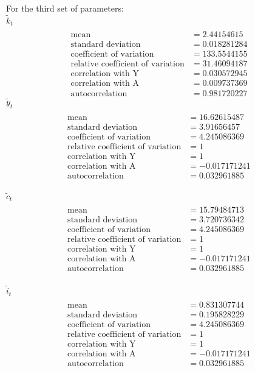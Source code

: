 \documentclass[letterpaper,12pt]{article}
\theoremstyle{definition}
\begin{document}
For the third set of parameters:\\
$\tilde{k}_t$
\begin{align*}
\\\text{mean} &= 2.44154615
\\\text{standard deviation} &= 0.018281284
\\\text{coefficient of variation}&=133.5544155
\\\text{relative coefficient of variation}&=31.46094187
\\\text{correlation with Y}&=0.030572945
\\\text{correlation with A}&=0.009737369
\\\text{autocorrelation}&=0.981720227
\end{align*}
$\tilde{y}_t$
\begin{align*}
\\\text{mean} &= 16.62615487
\\\text{standard deviation} &= 3.91656457
\\\text{coefficient of variation}&=4.245086369
\\\text{relative coefficient of variation}&=1
\\\text{correlation with Y}&=1
\\\text{correlation with A}&=-0.017171241
\\\text{autocorrelation}&=0.032961885
\end{align*}
\\
$\tilde{c}_t$
\begin{align*}
\\\text{mean} &= 15.79484713
\\\text{standard deviation} &= 	3.720736342
\\\text{coefficient of variation}&=	4.245086369
\\\text{relative coefficient of variation}&=1
\\\text{correlation with Y}&=1
\\\text{correlation with A}&=-0.017171241
\\\text{autocorrelation}&=	0.032961885
\end{align*}
\\
$\tilde{i}_t$
\begin{align*}
\\\text{mean} &= 0.831307744
\\\text{standard deviation} &= 0.195828229
\\\text{coefficient of variation}&=4.245086369
\\\text{relative coefficient of variation}&=1
\\\text{correlation with Y}&=1
\\\text{correlation with A}&=-0.017171241
\\\text{autocorrelation}&=0.032961885
\end{align*}
\end{document}
